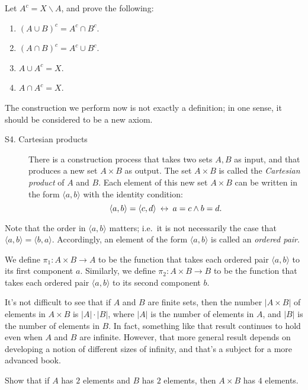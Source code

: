 \begin{exercises} Let $A^c=X\backslash A$, and prove the
  following: \begin{enumerate}
  \item $(A\cup B)^c=A^c\cap B^c$.
  \item $(A\cap B)^c=A^c\cup B^c$.
  \item $A\cup A^c=X$.
  \item $A\cap A^c=X$.    
  \end{enumerate} \end{exercises}

The construction we perform now is not exactly a definition; in one
sense, it should be considered to be a new axiom.

\begin{description}
  \item[S4. Cartesian products] There is a construction process that takes two sets
$A,B$ as input, and that produces a new set $A\times B$ as output.
The set $A\times B$ is called the \emph{Cartesian product} of $A$ and
$B$. Each element of this new set $A\times B$ can be written in the
form $\langle a,b\rangle$ with the identity condition:
\[ \langle a,b\rangle = \langle c,d\rangle \: \leftrightarrow \: a=c \wedge
  b=d . \] \end{description}

Note that the order in $\langle a,b\rangle$ matters; i.e.\ it is not
necessarily the case that $\langle a,b\rangle =\langle b,a\rangle$.
Accordingly, an element of the form $\langle a,b\rangle$ is called an
\emph{ordered pair}.

We define $\pi _1:A\times B\to A$ to be the function that takes each
ordered pair $\langle a,b\rangle$ to its first component $a$.
Similarly, we define $\pi _2:A\times B\to B$ to be the function that
takes each ordered pair $\langle a,b\rangle$ to its second component
$b$.

It's not difficult to see that if $A$ and $B$ are finite sets, then
the number $|A\times B|$ of elements in $A\times B$ is $|A|\cdot |B|$,
where $|A|$ is the number of elements in $A$, and $|B|$ is the number
of elements in $B$.  In fact, something like that result continues to
hold even when $A$ and $B$ are infinite.  However, that more general
result depends on developing a notion of different sizes of infinity,
and that's a subject for a more advanced book.

\begin{exercise} Show that if $A$ has $2$ elements and $B$ has $2$
  elements, then $A\times B$ has $4$ elements. \end{exercise}

